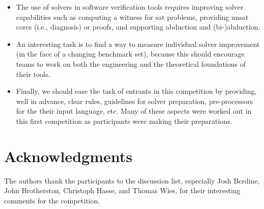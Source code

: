 \documentclass{llncs}
\begin{document}
\begin{itemize}
\item The use of solvers in software verification tools requires improving solver capabilities such as
computing a witness for sat problems,
providing unsat cores (i.e., diagnosis) or proofs,
and supporting abduction and (bi-)abduction.

\item An interesting task is to find a way to measure individual solver improvement (in the face of a changing benchmark set), because this should encourage teams to work on both the engineering and the theoretical foundations of their tools.
% 

\item Finally, we should ease the task of entrants in this competition by providing, well in advance, clear rules, guidelines for solver preparation, pre-processors for the their input language, etc. Many of these aspects were worked out in this first competition as participants were making their preparations.

\end{itemize}


\section*{Acknowledgments}

The authors thank the participants to the discussion list, especially 
Josh Berdine, John Brotherston, Christoph Hasse, and Thomas Wies, 
for their interesting comments for the competition.





\end{document}

